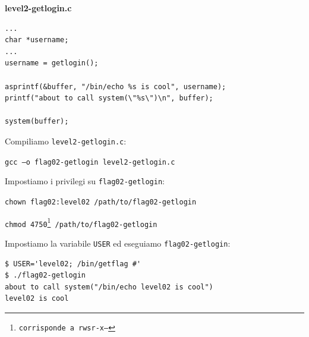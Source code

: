 \begin{mdframed}[backgroundcolor=white!20,shadow=false]
\textbf{level2-getlogin.c}
\begin{verbatim}
...
char *username;
...
username = getlogin();

asprintf(&buffer, "/bin/echo %s is cool", username);
printf("about to call system(\"%s\")\n", buffer);

system(buffer);
\end{verbatim}
\end{mdframed}
Compiliamo \texttt{level2-getlogin.c}:
\begin{center}
    \texttt{gcc –o flag02-getlogin level2-getlogin.c}
\end{center}
Impostiamo i privilegi su \texttt{flag02-getlogin}:
\begin{center}
    \texttt{chown flag02:level02 /path/to/flag02-getlogin}
    
    \texttt{chmod 4750\footnote{corrisponde a \texttt{rwsr-x---}} /path/to/flag02-getlogin}
\end{center}
Impostiamo la variabile \texttt{USER} ed eseguiamo \texttt{flag02-getlogin}:

\begin{mdframed}[backgroundcolor=white!20,shadow=false]
\begin{lstlisting}
$ USER='level02; /bin/getflag #'
$ ./flag02-getlogin
about to call system("/bin/echo level02 is cool")
level02 is cool
\end{lstlisting}
\end{mdframed}


